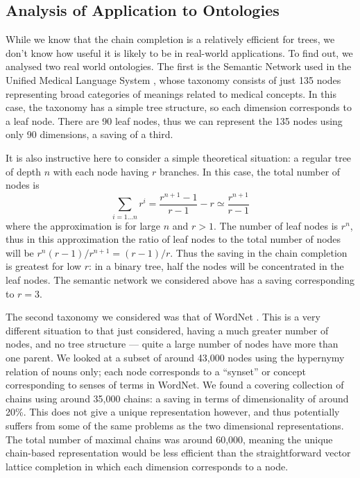 \subsection{Analysis of Application to Ontologies}

While we know that the chain completion is a relatively efficient for trees, we don't know how useful it is likely to be in real-world applications. To find out, we analysed two real world ontologies. The first is the Semantic Network used in the Unified Medical Language System \citep{National:98}, whose taxonomy consists of just 135 nodes representing broad categories of meanings related to medical concepts. In this case, the taxonomy has a simple tree structure, so each dimension corresponds to a leaf node. There are 90 leaf nodes, thus we can represent the 135 nodes using only 90 dimensions, a saving of a third.

It is also instructive here to consider a simple theoretical situation: a regular tree of depth $n$ with each node having $r$ branches. In this case, the total number of nodes is
$$\sum_{i=1\ldots n} r^i = \frac{r^{n+1} - 1}{r - 1} - r \simeq \frac{r^{n+1}}{r - 1}$$
where the approximation is for large $n$ and $r > 1$. The number of leaf nodes is $r^n$, thus in this approximation the ratio of leaf nodes to the total number of nodes will be $r^n (r-1)/r^{n+1} = (r-1)/r$. Thus the saving in the chain completion is greatest for low $r$: in a binary tree, half the nodes will be concentrated in the leaf nodes. The semantic network we considered above has a saving corresponding to $r = 3$.

The second taxonomy we considered was that of WordNet \citep{Fellbaum:98}. This is a very different situation to that just considered, having a much greater number of nodes, and no tree structure --- quite a large number of nodes have more than one parent. We looked at a subset of around 43,000 nodes using the hypernymy relation of nouns only; each node corresponds to a ``synset'' or concept corresponding to senses of terms in WordNet. We found a covering collection of chains using around 35,000 chains: a saving in terms of dimensionality of around 20\%. This does not give a unique representation however, and thus potentially suffers from some of the same problems as the two dimensional representations. The total number of maximal chains was around 60,000, meaning the unique chain-based representation would be less efficient than the straightforward vector lattice completion in which each dimension corresponds to a node.

